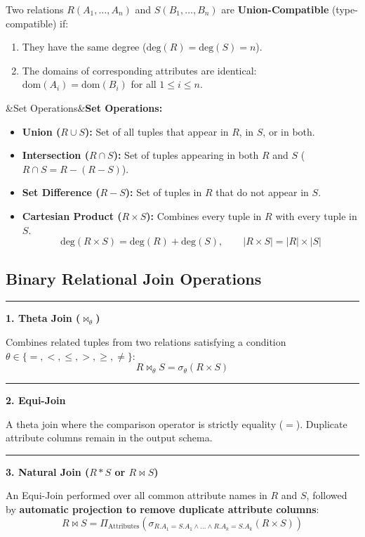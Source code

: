 \documentclass[11pt,a4paper]{article}
\newcommand{\concept}[1]{%
  \vspace{3pt}\noindent\textcolor{AnthGreen}{\rule{3.5pt}{10pt}}\enspace
  \textbf{\sffamily\color{AnthDark}#1}\par\vspace{2pt}%
}
\newenvironment{Def}[1][]{\begin{tcolorbox}[defbox]\ifx&#1&\else\textbf{\color{AnthOrange}#1:}\enspace\fi}{\end{tcolorbox}}
\begin{document}
Two relations $R(A_1, \dots, A_n)$ and $S(B_1, \dots, B_n)$ are \textbf{Union-Compatible} (type-compatible) if:
\begin{enumerate}
  \item They have the same degree ($\text{deg}(R) = \text{deg}(S) = n$).
  \item The domains of corresponding attributes are identical: $\text{dom}(A_i) = \text{dom}(B_i)$ for all $1 \le i \le n$.
\end{enumerate}

\begin{Def}[Set Operations]
\begin{itemize}
  \item \textbf{Union ($R \cup S$):} Set of all tuples that appear in $R$, in $S$, or in both.
  \item \textbf{Intersection ($R \cap S$):} Set of tuples appearing in both $R$ and $S$ ($R \cap S = R - (R - S)$).
  \item \textbf{Set Difference ($R - S$):} Set of tuples in $R$ that do not appear in $S$.
  \item \textbf{Cartesian Product ($R \times S$):} Combines every tuple in $R$ with every tuple in $S$.
    \begin{equation}
      \text{deg}(R \times S) = \text{deg}(R) + \text{deg}(S), \qquad |R \times S| = |R| \times |S|
    \end{equation}
\end{itemize}
\end{Def}

\subsection{Binary Relational Join Operations}

\concept{1. Theta Join ($\bowtie_\theta$)}
Combines related tuples from two relations satisfying a condition $\theta \in \{ =, <, \le, >, \ge, \neq \}$:
\begin{equation}
  R \bowtie_{\theta} S = \sigma_{\theta}(R \times S)
\end{equation}

\concept{2. Equi-Join}
A theta join where the comparison operator is strictly equality ($=$). Duplicate attribute columns remain in the output schema.

\concept{3. Natural Join ($R \ast S$ or $R \bowtie S$)}
An Equi-Join performed over all common attribute names in $R$ and $S$, followed by \textbf{automatic projection to remove duplicate attribute columns}:
\begin{equation}
  R \bowtie S = \Pi_{\text{Attributes}}( \sigma_{R.A_1 = S.A_1 \land \dots \land R.A_k = S.A_k}(R \times S) )
\end{equation}
\end{document}
